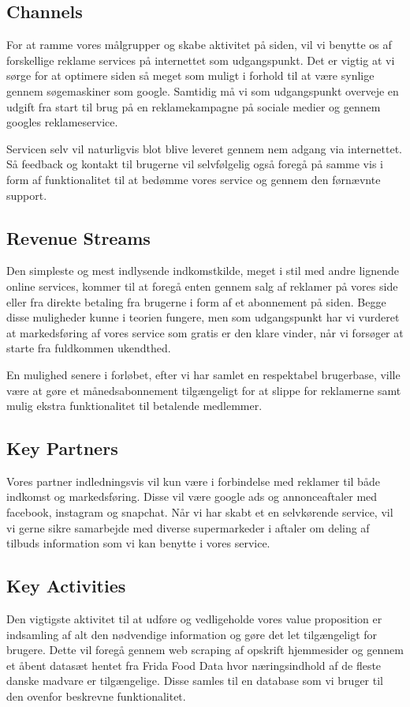 \documentclass{article}
\begin{document}
\subsection{Channels}
For at ramme vores målgrupper og skabe aktivitet på siden, vil vi benytte os af forskellige reklame services på internettet som udgangspunkt. Det er vigtig at vi sørge for at optimere siden så meget som muligt i forhold til at være synlige gennem søgemaskiner som google. Samtidig må vi som udgangspunkt overveje en udgift fra start til brug på en reklamekampagne på sociale medier og gennem googles reklameservice.

Servicen selv vil naturligvis blot blive leveret gennem nem adgang via internettet. Så feedback og kontakt til brugerne vil selvfølgelig også foregå på samme vis i form af funktionalitet til at bedømme vores service og gennem den førnævnte support.

\subsection{Revenue Streams}
Den simpleste og mest indlysende indkomstkilde, meget i stil med andre lignende online services, kommer til at foregå enten gennem salg af reklamer på vores side eller fra direkte betaling fra brugerne i form af et abonnement på siden. Begge disse muligheder kunne i teorien fungere, men som udgangspunkt har vi vurderet at markedsføring af vores service som gratis er den klare vinder, når vi forsøger at starte fra fuldkommen ukendthed. 

En mulighed senere i forløbet, efter vi har samlet en respektabel brugerbase, ville være at gøre et månedsabonnement tilgængeligt for at slippe for reklamerne samt mulig ekstra funktionalitet til betalende medlemmer. 

\subsection{Key Partners}
Vores partner indledningsvis vil kun være i forbindelse med reklamer til både indkomst og markedsføring. Disse vil være google ads og annonceaftaler med facebook, instagram og snapchat. Når vi har skabt et en selvkørende service, vil vi gerne sikre samarbejde med diverse supermarkeder i aftaler om deling af tilbuds information som vi kan benytte i vores service.

\subsection{Key Activities}
Den vigtigste aktivitet til at udføre og vedligeholde vores value proposition er indsamling af alt den nødvendige information og gøre det let tilgængeligt for brugere. Dette vil foregå gennem web scraping af opskrift hjemmesider og gennem et åbent datasæt hentet fra Frida Food Data hvor næringsindhold af de fleste danske madvare er tilgængelige. Disse samles til en database som vi bruger til den ovenfor beskrevne funktionalitet. 
\end{document}
